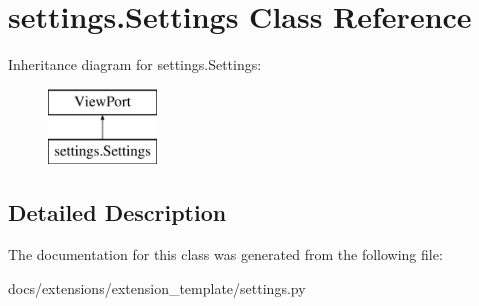\hypertarget{classsettings_1_1Settings}{\section{settings.\-Settings Class Reference}
\label{classsettings_1_1Settings}
}
Inheritance diagram for settings.\-Settings\-:\begin{figure}[H]
\begin{center}
\leavevmode
\includegraphics[height=2.000000cm]{classsettings_1_1Settings}
\end{center}
\end{figure}


\subsection{Detailed Description}
\begin{DoxyVerb}\end{DoxyVerb}
 

The documentation for this class was generated from the following file\-:\begin{DoxyCompactItemize}
\item 
docs/extensions/extension\-\_\-template/settings.\-py\end{DoxyCompactItemize}
